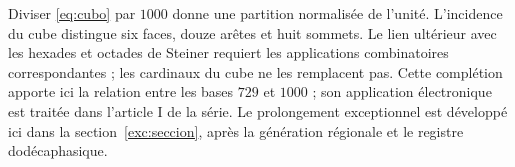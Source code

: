 Diviser \eqref{eq:cubo} par \(1000\) donne une partition normalisée de l’unité. L’incidence du cube distingue six faces, douze arêtes et huit sommets. Le lien ultérieur avec les hexades et octades de Steiner requiert les applications combinatoires correspondantes ; les cardinaux du cube ne les remplacent pas. Cette complétion apporte ici la relation entre les bases \(729\) et \(1000\) ; son application électronique est traitée dans l’article I de la série. Le prolongement exceptionnel est développé ici dans la section~\ref{exc:seccion}, après la génération régionale et le registre dodécaphasique.





